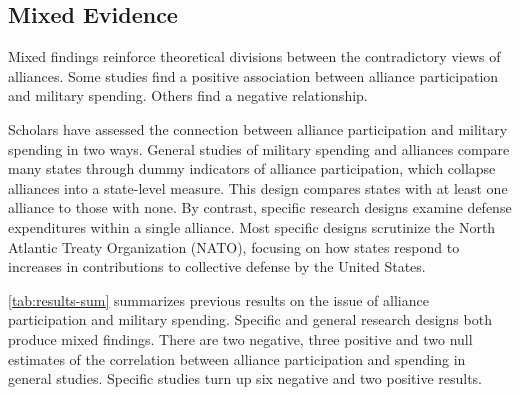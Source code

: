 \documentclass[12pt]{article}
\begin{document}
\subsection{Mixed Evidence} 


Mixed findings reinforce theoretical divisions between the contradictory views of alliances.
Some studies find a positive association between alliance participation and military spending. 
Others find a negative relationship.


Scholars have assessed the connection between alliance participation and military spending in two ways. 
General studies of military spending and alliances compare many states through dummy indicators of alliance participation, which collapse alliances into a state-level measure. 
This design compares states with at least one alliance to those with none.
By contrast, specific research designs examine defense expenditures within a single alliance. 
Most specific designs scrutinize the North Atlantic Treaty Organization (NATO), focusing on how states respond to increases in contributions to collective defense by the United States.


\autoref{tab:results-sum} summarizes previous results on the issue of alliance participation and military spending. 
Specific and general research designs both produce mixed findings. 
There are two negative, three positive and two null estimates of the correlation between alliance participation and spending in general studies. 
Specific studies turn up six negative and two positive results.  
\end{document}
